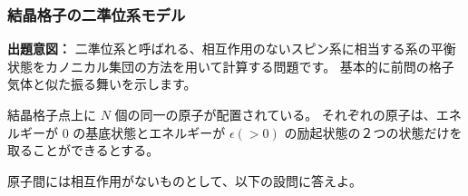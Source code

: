\documentclass[uplatex,dvipdfmx,a4paper,11pt]{jsarticle}
\begin{document}
\newpage

\subsubsection{結晶格子の二準位系モデル}

\begin{boxnote}
{\bf 出題意図：}
二準位系と呼ばれる、相互作用のないスピン系に相当する系の平衡状態をカノニカル集団の方法を用いて計算する問題です。
基本的に前問の格子気体と似た振る舞いを示します。
\end{boxnote}
\vspace{8pt}

結晶格子点上に $N$ 個の同一の原子が配置されている。
それぞれの原子は、エネルギーが $0$ の基底状態とエネルギーが $\epsilon (>0)$ の励起状態の２つの状態だけを取ることができるとする。

原子間には相互作用がないものとして、以下の設問に答えよ。
\end{document}
